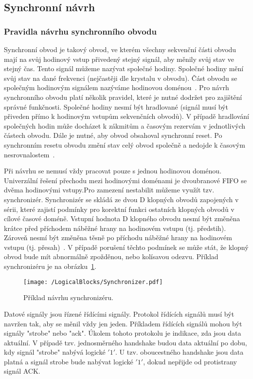 \documentclass{report}
\begin{document}
\subsection{Synchronní návrh}\label{sec:synchronniaasynchronninavrh}
\subsubsection{Pravidla návrhu synchronního obvodu}
Synchronní obvod je takový obvod, ve kterém všechny sekvenční části obvodu mají na svůj hodinový vstup přivedený stejný signál, aby měnily svůj stav ve stejný čas. Tento signál můžeme nazývat společné hodiny. Společné hodiny mění svůj stav na dané frekvenci (nejčastěji dle krystalu v obvodu). Část obvodu se společným hodinovým signálem nazýváme hodinovou doménou~\cite{hodinovedomeny}. Pro návrh synchronního obvodu platí několik pravidel, které je nutné dodržet pro zajištění správné funkčnosti. Společné hodiny nesmí být hradlované (signál musí být přiveden přímo k hodinovým vstupům sekvenčních obvodů). V případě hradlování společných hodin může docházet k zákmitům a časovým rezervám v jednotlivých částech obvodu. Dále je nutné, aby obvod obsahoval synchronní reset. Po synchronním resetu obvodu změní stav celý obvod společně a nedojde k časovým nesrovnalostem~\cite{hodinovedomeny}. \par
Při návrhu se nemusí vždy pracovat pouze s jednou hodinovou doménou. Univerzální řešení přechodu mezi hodinovými doménami je dvoubranové FIFO se dvěma hodinovými vstupy.Pro zamezení nestabilit můžeme využít tzv. synchronizér. Synchronizér se skládá ze dvou D klopných obvodů zapojených v sérii, které zajistí podmínky pro korektní funkci ostatních klopných obvodů v cílové časové doméně. Vstupní hodnota D klopného obvodu nesmí být změněna krátce před příchodem náběžné hrany na hodinovém vstupu (tj. předstih). Zároveň nesmí být změněna těsně po příchodu náběžné hrany na hodinovém vstupu (tj. přesah)~\cite{hodinovedomeny}. V případě porušení těchto podmínek se může stát, že klopný obvod bude mít abnormálně zpožděnou, nebo kolísavou odezvu. Příklad synchronizéru je na obrázku~\ref{fig:synchronizer}.
\begin{figure}
\centering
\texttt{[image: /LogicalBlocks/Synchronizer.pdf]}
\caption{Příklad návrhu synchronizéru.}
\label{fig:synchronizer}
\end{figure}
\par
Datové signály jsou řízené řídícími signály. Protokol řídících signálů musí být navržen tak, aby se měnil vždy jen jeden. Příkladem řídících signálů mohou být signály "strobe" nebo "ack". Úkolem tohoto protokolu je indikace, zda jsou data aktuální. V případě tzv. jednosměrného handshake budou data aktuální po dobu, kdy signál "strobe" nabývá logické $'1'$. U tzv. oboucestného handshake jsou data platná a signál strobe bude nabývat logické $'1'$, dokud nepřijde od protistrany signál ACK.
\end{document}
